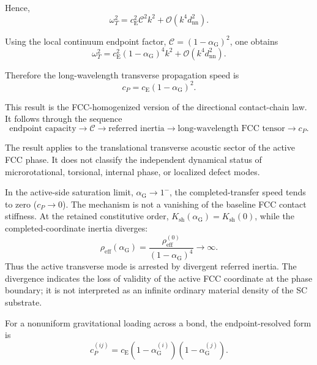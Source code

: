 Hence,
\begin{equation}
    \omega_T^2 = c_{\mathrm{E}}^2 \mathcal{C}^2k^2 + \mathcal{O}(k^4d_{\mathrm{nn}}^2).
\end{equation}

Using the local continuum endpoint factor, $\mathcal{C}=(1-\alpha_{\mathrm{G}})^2$, one obtains
\begin{equation}
    \boxed{ \omega_T^2 = c_{\mathrm{E}}^2 (1-\alpha_{\mathrm{G}})^4 k^2 + \mathcal{O}(k^4d_{\mathrm{nn}}^2) }.
\end{equation}

Therefore the long-wavelength transverse propagation speed is
\begin{equation}
    \boxed{ c_P = c_{\mathrm{E}}(1-\alpha_{\mathrm{G}})^2 }.
\end{equation}

This result is the FCC-homogenized version of the directional contact-chain law. It follows through the sequence
\begin{equation}
    \text{endpoint capacity} \longrightarrow \mathcal{C} \longrightarrow \text{referred inertia} \longrightarrow \text{long-wavelength FCC tensor} \longrightarrow c_P.
\end{equation}

The result applies to the translational transverse acoustic sector of the active FCC phase. It does not classify the independent dynamical status of microrotational, torsional, internal phase, or localized defect modes.

In the active-side saturation limit, $\alpha_{\mathrm{G}} \rightarrow 1^-$, the completed-transfer speed tends to zero ($c_P \rightarrow 0$). The mechanism is not a vanishing of the baseline FCC contact stiffness. At the retained constitutive order, $K_{\mathrm{sh}}(\alpha_{\mathrm{G}}) = K_{\mathrm{sh}}(0)$, while the completed-coordinate inertia diverges:
\begin{equation}
    \rho_{\mathrm{eff}}(\alpha_{\mathrm{G}}) = \frac{\rho_{\mathrm{eff}}^{(0)}}{(1-\alpha_{\mathrm{G}})^4} \rightarrow \infty.
\end{equation}
Thus the active transverse mode is arrested by divergent referred inertia. The divergence indicates the loss of validity of the active FCC coordinate at the phase boundary; it is not interpreted as an infinite ordinary material density of the SC substrate.

For a nonuniform gravitational loading across a bond, the endpoint-resolved form is
\begin{equation}
    c_P^{(ij)} = c_{\mathrm{E}} (1-\alpha_{\mathrm{G}}^{(i)}) (1-\alpha_{\mathrm{G}}^{(j)}).
\end{equation}

